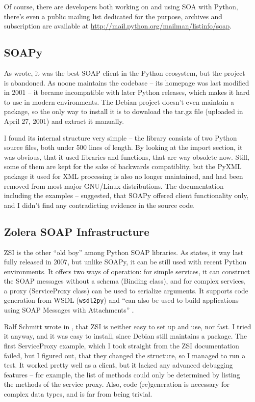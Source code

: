 Of course, there are developers both working on and using SOA with Python, there's even a public mailing list dedicated for the purpose, archives and subscription are available at \url{http://mail.python.org/mailman/listinfo/soap}.

\subsection{SOAPy}

As \cite{so-206154} wrote, it was the best SOAP client in the Python ecosystem, but the project is abandoned. As noone maintains the codebase -- its homepage was last modified in 2001 -- it became incompatible with later Python releases, which makes it hard to use in modern environments. The Debian project doesn't even maintain a package, so the only way to install it is to download the tar.gz file (uploaded in April 27, 2001) and extract it manually.

I found its internal structure very simple -- the library consists of two Python source files, both under 500 lines of length. By looking at the import section, it was obvious, that it used libraries and functions, that are way obsolete now. Still, some of them are kept for the sake of backwards compatiblity, but the PyXML package it used for XML processing is also no longer maintained, and had been removed from most major GNU/Linux distributions. The documentation -- including the examples -- suggested, that SOAPy offered client functionality only, and I didn't find any contradicting evidence in the source code.

\subsection{Zolera SOAP Infrastructure}
\label{ZSI}

ZSI is the other ``old boy'' among Python SOAP libraries. As \cite{pywebsvcs-talk} states, it way last fully released in 2007, but unlike SOAPy, it can be still used with recent Python environments. It offers two ways of operation: for simple services, it can construct the SOAP messages without a schema (Binding class), and for complex services, a proxy (ServiceProxy class) can be used to serialize arguments. It supports code generation from WSDL (\verb|wsdl2py|) and ``can also be used to build applications using SOAP Messages with Attachments'' \cite{zsi-doc}.

Ralf Schmitt wrote in \cite{zsi-velocity}, that ZSI is neither easy to set up and use, nor fast. I tried it anyway, and it was easy to install, since Debian still maintains a package. The first ServiceProxy example, which I took straight from the ZSI documentation failed, but I figured out, that they changed the structure, so I managed to run a test. It worked pretty well as a client, but it lacked any advanced debugging features -- for example, the list of methods could only be determined by listing the methods of the service proxy. Also, code (re)generation is necessary for complex data types, and is far from being trivial.

